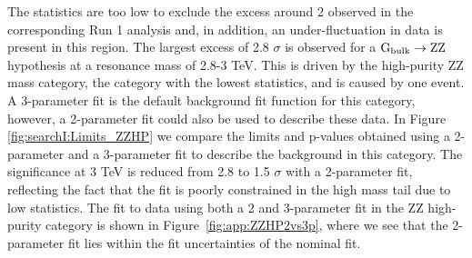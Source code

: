 The statistics are too low to exclude the excess around 2 \TeV observed in the corresponding Run 1 analysis and, in addition, an under-fluctuation in data is present in this region. The largest excess of 2.8 $\sigma$ is observed for a $\mathrm{G}_\mathrm{bulk} \rightarrow \mathrm{Z}\mathrm{Z}$ hypothesis at a resonance mass of 2.8-3 TeV. This is driven by the high-purity ZZ mass category, the category with the lowest statistics, and is caused by one event. A 3-parameter fit is the default background fit function for this category, however, a 2-parameter fit could also be used to describe these data. In Figure \ref{fig:searchI:Limits_ZZHP} we compare the limits and p-values obtained using a 2-parameter and a 3-parameter fit to describe the background in this category. The significance at 3 TeV is reduced from 2.8 to 1.5 $\sigma$ with a 2-parameter fit, reflecting the fact that the fit is poorly constrained in the high mass tail due to low statistics. The fit to data using both a 2 and 3-parameter fit in the ZZ high-purity category is shown in Figure~\ref{fig:app:ZZHP2vs3p}, where we see that the 2-parameter fit lies within the fit uncertainties of the nominal fit.
